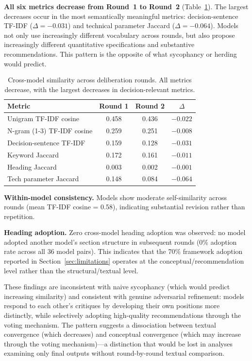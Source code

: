 \documentclass[11pt,a4paper]{article}
\begin{document}
\textbf{All six metrics decrease from Round~1 to Round~2} (Table~\ref{tab:similarity}). The largest decreases occur in the most semantically meaningful metrics: decision-sentence TF-IDF ($\Delta = -0.031$) and technical parameter Jaccard ($\Delta = -0.064$). Models not only use increasingly different vocabulary across rounds, but also propose increasingly different quantitative specifications and substantive recommendations. This pattern is the opposite of what sycophancy or herding would predict.

\begin{table}[t]
\centering
\caption{Cross-model similarity across deliberation rounds. All metrics decrease, with the largest decreases in decision-relevant metrics.}
\label{tab:similarity}
\begin{tabular}{lccc}
\toprule
Metric & Round 1 & Round 2 & $\Delta$ \\
\midrule
Unigram TF-IDF cosine & 0.458 & 0.436 & $-0.022$ \\
N-gram (1-3) TF-IDF cosine & 0.259 & 0.251 & $-0.008$ \\
Decision-sentence TF-IDF & 0.159 & 0.128 & $-0.031$ \\
Keyword Jaccard & 0.172 & 0.161 & $-0.011$ \\
Heading Jaccard & 0.003 & 0.002 & $-0.001$ \\
Tech parameter Jaccard & 0.148 & 0.084 & $-0.064$ \\
\bottomrule
\end{tabular}
\end{table}

\textbf{Within-model consistency.} Models show moderate self-similarity across rounds (mean TF-IDF cosine = 0.58), indicating substantial revision rather than repetition.

\textbf{Heading adoption.} Zero cross-model heading adoption was observed: no model adopted another model's section structure in subsequent rounds (0\% adoption rate across all 36 model pairs). This indicates that the 70\% framework adoption reported in Section~\ref{sec:limitations} operates at the conceptual/recommendation level rather than the structural/textual level.

These findings are inconsistent with naive sycophancy (which would predict increasing similarity) and consistent with genuine adversarial refinement: models respond to each other's critiques by developing their own positions more distinctly, while selectively adopting high-quality recommendations through the voting mechanism. The pattern suggests a dissociation between textual convergence (which decreases) and conceptual convergence (which may increase through the voting mechanism)---a distinction that would be lost in analyses examining only final outputs without round-by-round textual comparison.
\end{document}
